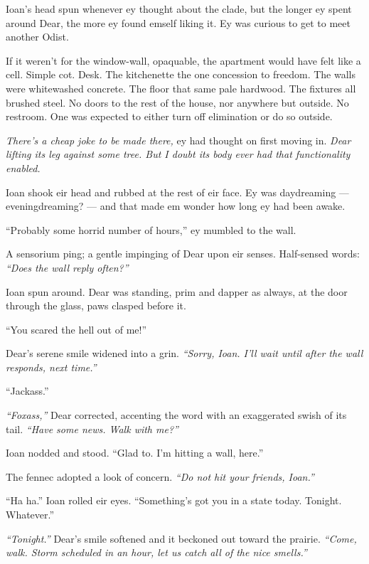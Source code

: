 Ioan's head spun whenever ey thought about the clade, but the longer ey spent around Dear, the more ey found emself liking it. Ey was curious to get to meet another Odist.

If it weren't for the window-wall, opaquable, the apartment would have felt like a cell. Simple cot. Desk. The kitchenette the one concession to freedom. The walls were whitewashed concrete. The floor that same pale hardwood. The fixtures all brushed steel. No doors to the rest of the house, nor anywhere but outside. No restroom. One was expected to either turn off elimination or do so outside.

\emph{There's a cheap joke to be made there,} ey had thought on first moving in. \emph{Dear lifting its leg against some tree. But I doubt its body ever had that functionality enabled.}

Ioan shook eir head and rubbed at the rest of eir face. Ey was daydreaming — eveningdreaming? — and that made em wonder how long ey had been awake.

``Probably some horrid number of hours,'' ey mumbled to the wall.

A sensorium ping; a gentle impinging of Dear upon eir senses. Half-sensed words: \emph{``Does the wall reply often?''}

Ioan spun around. Dear was standing, prim and dapper as always, at the door through the glass, paws clasped before it.

``You scared the hell out of me!''

Dear's serene smile widened into a grin. \emph{``Sorry, Ioan. I'll wait until after the wall responds, next time.''}

``Jackass.''

\emph{``Foxass,''} Dear corrected, accenting the word with an exaggerated swish of its tail. \emph{``Have some news. Walk with me?''}

Ioan nodded and stood. ``Glad to. I'm hitting a wall, here.''

The fennec adopted a look of concern. \emph{``Do not hit your friends, Ioan.''}

``Ha ha.'' Ioan rolled eir eyes. ``Something's got you in a state today. Tonight. Whatever.''

\emph{``Tonight.''} Dear's smile softened and it beckoned out toward the prairie. \emph{``Come, walk. Storm scheduled in an hour, let us catch all of the nice smells.''}
